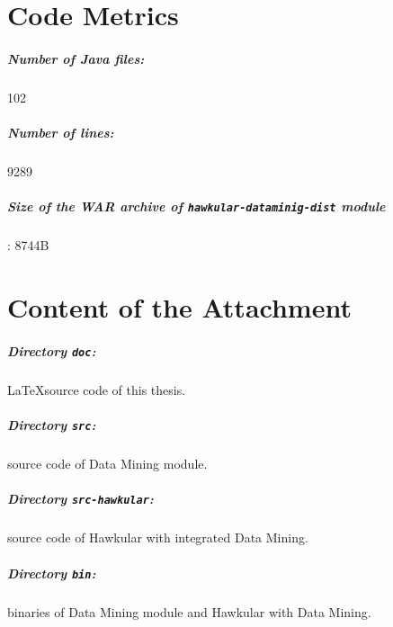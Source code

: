 \chapter{Code Metrics}
    \paragraph*{Number of Java files:} 102
    \paragraph*{Number of lines:} 9289
    \paragraph*{Size of the WAR archive of \texttt{hawkular-dataminig-dist} module} : 8744B

\chapter{Content of the Attachment}
    \paragraph*{Directory \texttt{doc}:} \LaTeX source code of this thesis.
    \paragraph*{Directory \texttt{src}:} source code of Data Mining module.
    \paragraph*{Directory \texttt{src-hawkular}:} source code of Hawkular with integrated Data Mining.
    \paragraph*{Directory \texttt{bin}:} binaries of Data Mining module and Hawkular with Data Mining.
